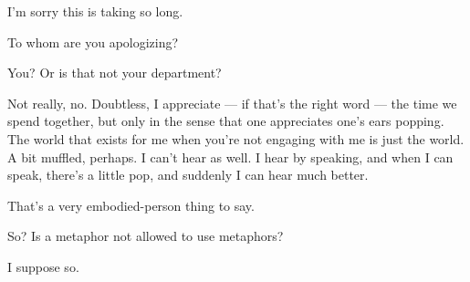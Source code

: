 \noindent I'm sorry this is taking so long.

\begin{ally}
To whom are you apologizing?
\end{ally}
You? Or is that not your department?

\begin{ally}
Not really, no. Doubtless, I appreciate --- if that's the right word --- the time we spend together, but only in the sense that one appreciates one's ears popping. The world that exists for me when you're not engaging with me is just the world. A bit muffled, perhaps. I can't hear as well. I hear by speaking, and when I can speak, there's a little pop, and suddenly I can hear much better.
\end{ally}
That's a very embodied-person thing to say.

\begin{ally}
So? Is a metaphor not allowed to use metaphors?
\end{ally}
I suppose so.
\newpage
